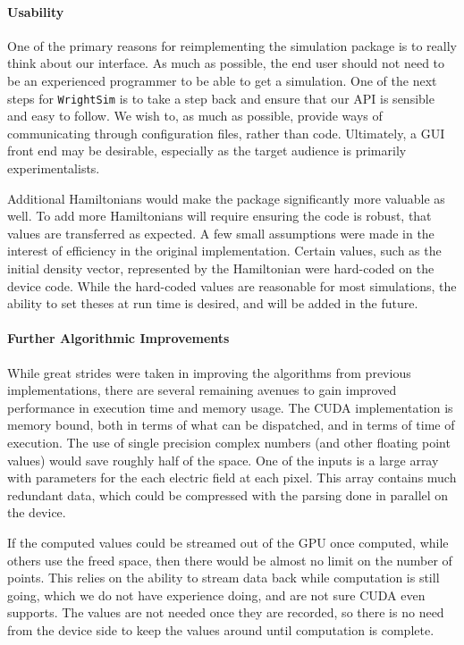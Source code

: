 \hypertarget{usability}{%
\paragraph{Usability}\label{usability}}

One of the primary reasons for reimplementing the simulation package is
to really think about our interface. As much as possible, the end user
should not need to be an experienced programmer to be able to get a
simulation. One of the next steps for \texttt{WrightSim} is to take a
step back and ensure that our API is sensible and easy to follow. We
wish to, as much as possible, provide ways of communicating through
configuration files, rather than code. Ultimately, a GUI front end may
be desirable, especially as the target audience is primarily
experimentalists.

Additional Hamiltonians would make the package significantly more
valuable as well. To add more Hamiltonians will require ensuring the
code is robust, that values are transferred as expected. A few small
assumptions were made in the interest of efficiency in the original
implementation. Certain values, such as the initial density vector,
represented by the Hamiltonian were hard-coded on the device code. While
the hard-coded values are reasonable for most simulations, the ability
to set theses at run time is desired, and will be added in the future.

\hypertarget{further-algorithmic-improvements}{%
\paragraph{Further Algorithmic
Improvements}\label{further-algorithmic-improvements}}

While great strides were taken in improving the algorithms from previous
implementations, there are several remaining avenues to gain improved
performance in execution time and memory usage. The CUDA implementation
is memory bound, both in terms of what can be dispatched, and in terms
of time of execution. The use of single precision complex numbers (and
other floating point values) would save roughly half of the space. One
of the inputs is a large array with parameters for the each electric
field at each pixel. This array contains much redundant data, which
could be compressed with the parsing done in parallel on the device.

If the computed values could be streamed out of the GPU once computed,
while others use the freed space, then there would be almost no limit on
the number of points. This relies on the ability to stream data back
while computation is still going, which we do not have experience doing,
and are not sure CUDA even supports. The values are not needed once they
are recorded, so there is no need from the device side to keep the
values around until computation is complete.

